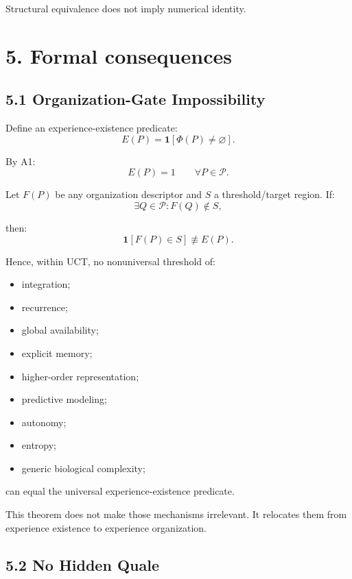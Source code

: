 \documentclass[
  11pt,
  a4paper,
]{article}
\providecommand{\tightlist}{%
  \setlength{\itemsep}{0pt}\setlength{\parskip}{0pt}}
\begin{document}
Structural equivalence does not imply numerical identity.

\hypertarget{formal-consequences}{%
\section{5. Formal consequences}\label{formal-consequences}}

\hypertarget{organization-gate-impossibility}{%
\subsection{5.1 Organization-Gate
Impossibility}\label{organization-gate-impossibility}}

Define an experience-existence predicate:
\nopagebreak[4]
\[
E(P)=\mathbf 1[\Phi(P)\neq\varnothing].
\]

By A1:
\nopagebreak[4]
\[
E(P)=1
\qquad
\forall P\in\mathcal P.
\]

Let \(F(P)\) be any organization descriptor and \(S\) a threshold/target
region. If:
\nopagebreak[4]
\[
\exists Q\in\mathcal P:
F(Q)\notin S,
\]

then:
\nopagebreak[4]
\[
\boxed{
\mathbf 1[F(P)\in S]
\not\equiv
E(P).
}
\]

Hence, within UCT, no nonuniversal threshold of:

\begin{itemize}
\tightlist
\item
  integration;
\item
  recurrence;
\item
  global availability;
\item
  explicit memory;
\item
  higher-order representation;
\item
  predictive modeling;
\item
  autonomy;
\item
  entropy;
\item
  generic biological complexity;
\end{itemize}

can equal the universal experience-existence predicate.

This theorem does not make those mechanisms irrelevant. It relocates
them from experience existence to experience organization.

\hypertarget{no-hidden-quale}{%
\subsection{5.2 No Hidden Quale}\label{no-hidden-quale}}
\end{document}
